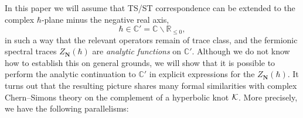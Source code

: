\documentclass[a4paper,11pt]{article}
\theoremstyle{definition}
\newcommand{\CK}{{\cal K}}
\def\IR{{\mathbb R}}
\def\IC{{\mathbb C}}
\def\bN{{\boldsymbol{N}}}
\begin{document}
In this paper we will assume that TS/ST correspondence can be extended to the complex $\hbar$-plane minus the negative real axis, 
%
\begin{equation}
\label{h-domain}
\hbar \in \IC'=\IC\backslash \IR_{\le 0},  
\end{equation}
%
in such a way that the relevant operators remain of trace class, 
and the fermionic spectral traces $Z_{\bN}(\hbar)$ are {\it analytic functions} on $\IC'$. 
Although we do not know
how to establish this on general grounds, we will show that it is possible to perform the 
analytic continuation to $\IC'$ in explicit expressions for the $Z_{\bN} (\hbar)$. 
It turns out that the resulting picture shares many formal similarities with complex Chern--Simons theory 
on the complement of a hyperbolic knot $\CK$. More precisely, we have 
the following parallelisms: 
%
\end{document}

